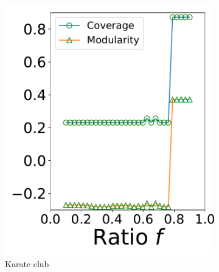 \begin{figure}[!htb]
    \centering

\begin{subfigure}{.3\textwidth} 
\centering
\includegraphics[width=.99\linewidth]{img/chap2/karate_coverage_modularity.pdf}
\caption{Karate club}
\end{subfigure}
\begin{subfigure}{.3\textwidth} 
\centering

\end{subfigure}
\end{figure}

